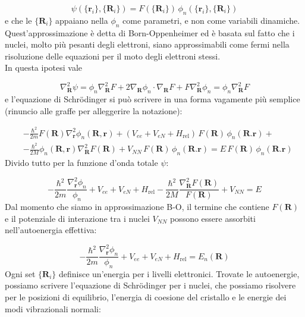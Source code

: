 \documentclass[a4paper]{report}
\begin{document}
\begin{equation}
    \psi(\{\mathbf{r}_i\},\{\mathbf{R}_i\}) = F(\{\mathbf{R}_i\}) \,\phi_n(\{\mathbf{r}_i\},\{\mathbf{R}_i\})
\end{equation}
e che le $\{\mathbf{R}_i\}$ appaiano nella $\phi_n$ come parametri, e non come variabili dinamiche. Quest'approssimazione è detta di Born-Oppenheimer ed è basata sul fatto che i nuclei, molto più pesanti degli elettroni, siano approssimabili come fermi nella risoluzione delle equazioni per il moto degli elettroni stessi.\\ In questa ipotesi vale

\begin{equation}
    \nabla^2_{\mathbf{R}}\psi = \phi_n \nabla^2_{\mathbf{R}}F + 2 \nabla_{\mathbf{R}}\phi_n \cdot \nabla_{\mathbf{R}} F + F \nabla^2_{\mathbf{R}}\phi_n = \phi_n \nabla^2_{\mathbf{R}}F
\end{equation}
e l'equazione di Schr\"odinger si può scrivere in una forma vagamente più semplice (rinuncio alle graffe per alleggerire la notazione):

\begin{equation}
\begin{split}
& -\frac{\hbar^2}{2m} F(\mathbf{R}) \nabla^2_{\mathbf{r}}\phi_n(\mathbf{R},\mathbf{r}) + (V_{ee} + V_{eN} + H_{\text{rel}} )\,F(\mathbf{R})\,\phi_n(\mathbf{R}. \mathbf{r}) + \\
& -\frac{\hbar^2}{2M} \phi_n(\mathbf{R},\mathbf{r}) \nabla^2_{\mathbf{R}} F(\mathbf{R}) + V_{NN} \,F(\mathbf{R})\,\phi_n(\mathbf{R}. \mathbf{r}) = E \,F(\mathbf{R})\,\phi_n(\mathbf{R}. \mathbf{r})
\end{split}
\end{equation}
Divido tutto per la funzione d'onda totale $\psi$:

\begin{equation}
    -\frac{\hbar^2}{2m}\frac{\nabla^2_{\mathbf{r}}\phi_n}{\phi_n} + V_{ee} + V_{eN} + H_{\text{rel}}  -\frac{\hbar^2}{2M}\frac{\nabla^2_{\mathbf{R}}F(\mathbf{R})}{F(\mathbf{R})} + V_{NN} = E
\end{equation}
Dal momento che siamo in approssimazione B-O, il termine che contiene $F(\mathbf{R})$ e il potenziale di interazione tra i nuclei $V_{NN}$ possono essere assorbiti nell'autoenergia effettiva:

\begin{equation}
    -\frac{\hbar^2}{2m}\frac{\nabla^2_{\mathbf{r}}\phi_n}{\phi_n} + V_{ee} + V_{eN} + H_{\text{rel}} = E_n(\mathbf{R})
\end{equation}
Ogni set $\{\mathbf{R}_i\}$ definisce un'energia per i livelli elettronici. Trovate le autoenergie, possiamo scrivere l'equazione di Schr\"odinger per i nuclei, che possiamo risolvere per le posizioni di equilibrio, l'energia di coesione del cristallo e le energie dei modi vibrazionali normali:
\end{document}
